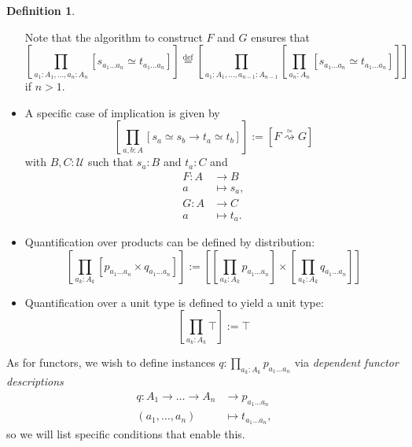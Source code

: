 \documentclass[a4paper]{article}
\theoremstyle{definition}
\newtheorem{definition}{Definition}[section]
\theoremstyle{remark}
\newcommand{\defn}{\emph}
\newcommand{\eqDef}{\overset{\text{def}}{=}}
\renewcommand{\equiv}{\simeq}
\newcommand{\equivto}{\overset{\equiv}{\rightsquigarrow}}
\newcommand{\U}{\mathcal{U}}
\begin{document}
\begin{definition}
\begin{itemize}
    Note that the algorithm to construct $F$ and $G$ ensures that
    \[\left[\prod_{a_1 : A_1, \dots, a_n : A_n} [s_{a_1 \dots a_n} \equiv t_{a_1 \dots a_n}]\right] \eqDef
      \left[\prod_{a_1 : A_1, \dots, a_{n-1} : A_{n-1}} \left[\prod_{a_n : A_n} [s_{a_1 \dots a_n} \equiv t_{a_1 \dots a_n}]\right]\right]\]
    if $n > 1.$
    \item A specific case of implication is given by
    \[\left[\prod_{a,b : A} [s_a \equiv s_b \to t_a \equiv t_b]\right] := [F \equivto G]\]
    with $B,C : \U$ such that $s_a : B$ and $t_a : C$ and
    \begin{align*}
      F : A &\to     B\\
          a &\mapsto s_a,\\[1ex]
      G : A &\to     C\\
          a &\mapsto t_a.
    \end{align*}
    \item Quantification over products can be defined by distribution:
    \[\left[\prod_{a_k : A_k} [p_{a_1 \dots a_n} \times q_{a_1 \dots a_n}]\right] :=
      \left[\left[\prod_{a_k : A_k} p_{a_1 \dots a_n}\right] \times
            \left[\prod_{a_k : A_k} q_{a_1 \dots a_n}\right]\right]\]
    \item Quantification over a unit type is defined to yield a unit type:
    \[\left[\prod_{a_k : A_k} \top\right] := \top\]
  \end{itemize}
\end{definition}

As for functors, we wish to define instances $q : \prod_{a_k : A_k} p_{a_1 \dots a_n}$ via
\defn{dependent functor descriptions}
\begin{align*}
  q : A_1 \to \dots \to A_n &\to     p_{a_1 \dots a_n}\\
      (a_1,\dots,a_n)       &\mapsto t_{a_1 \dots a_n},
\end{align*}
so we will list specific conditions that enable this.
\end{document}
